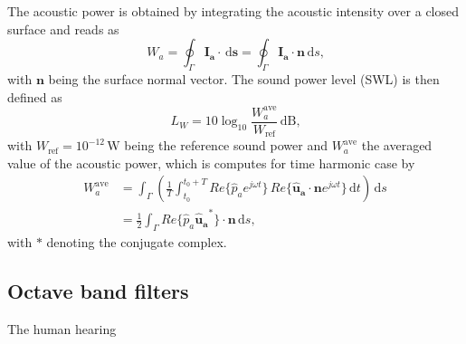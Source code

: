 The acoustic power is obtained by integrating the acoustic intensity over a closed surface and reads as
\begin{equation}
	W_a = \oint_{\Gamma} \boldsymbol{I_a}\cdot\,\text{d}\boldsymbol{s} = \oint_{\Gamma} \boldsymbol{I_a}\cdot\boldsymbol{n}\,\text{d}s \text{,}
\end{equation}
with $\boldsymbol{n}$ being the surface normal vector. The sound power level (SWL) is then defined as
\begin{equation}
	L_W = 10\log_{10}\frac{W_a^{\text{ave}}}{W_\text{ref}}\,\text{dB}\text{,}
\end{equation}
with $W_\text{ref} = 10^{-12}\,\text{W}$ being the reference sound power and $W_a^{\text{ave}}$ the averaged value of the acoustic power, which is computes for time harmonic case by
\begin{align}
	W_a^{\text{ave}} &= \int_{\Gamma}\left(\frac{1}{T} \int_{t_0}^{t_0 + T} Re\lbrace\hat{p}_a e^{j\omega t}\rbrace\,Re\lbrace\boldsymbol{\hat{u}_a} \cdot \boldsymbol{n} e^{j\omega t}\rbrace \, \text{d}t  \right)\,\text{d}s \\
	&= \frac{1}{2} \int_{\Gamma} Re\lbrace\hat{p}_a \boldsymbol{\hat{u}_a}^*\rbrace \cdot \boldsymbol{n}\,\text{d}s \text{,}
\end{align}
with $*$ denoting the conjugate complex.

\newpage
\subsection{Octave band filters}

The human hearing 

